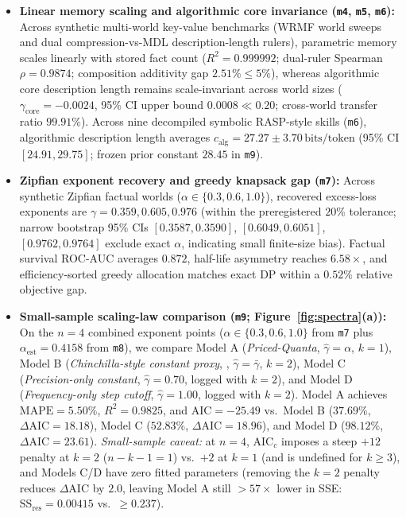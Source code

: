 \documentclass[10pt]{article} %
\begin{document}
\begin{itemize}[leftmargin=*]
    \item \textbf{Linear memory scaling and algorithmic core invariance (\texttt{m4}, \texttt{m5}, \texttt{m6}):} Across synthetic multi-world key-value benchmarks (WRMF world sweeps and dual compression-vs-MDL description-length rulers), parametric memory scales linearly with stored fact count ($R^2 = 0.999992$; dual-ruler Spearman $\rho = 0.9874$; composition additivity gap $2.51\% \le 5\%$), whereas algorithmic core description length remains scale-invariant across world sizes ($\gamma_{\text{core}} = -0.0024$, 95\% CI upper bound $0.0008 \ll 0.20$; cross-world transfer ratio $99.91\%$). Across nine decompiled symbolic RASP-style skills (\texttt{m6}), algorithmic description length averages $c_{\text{alg}} = 27.27 \pm 3.70\,\text{bits/token}$ (95\% CI $[24.91, 29.75]$; frozen prior constant $28.45$ in \texttt{m9}).
    \item \textbf{Zipfian exponent recovery and greedy knapsack gap (\texttt{m7}):} Across synthetic Zipfian factual worlds ($\alpha \in \{0.3, 0.6, 1.0\}$), recovered excess-loss exponents are $\gamma = 0.359, 0.605, 0.976$ (within the preregistered $20\%$ tolerance; narrow bootstrap 95\% CIs $[0.3587, 0.3590]$, $[0.6049, 0.6051]$, $[0.9762, 0.9764]$ exclude exact $\alpha$, indicating small finite-size bias). Factual survival ROC-AUC averages $0.872$, half-life asymmetry reaches $6.58\times$, and efficiency-sorted greedy allocation matches exact DP within a $0.52\%$ relative objective gap.
    \item \textbf{Small-sample scaling-law comparison (\texttt{m9}; Figure~\ref{fig:spectra}(a)):} On the $n=4$ combined exponent points ($\alpha \in \{0.3, 0.6, 1.0\}$ from \texttt{m7} plus $\alpha_{\text{est}} = 0.4158$ from \texttt{m8}), we compare Model A (\emph{Priced-Quanta}, $\hat{\gamma} = \alpha$, $k=1$), Model B (\emph{Chinchilla-style constant proxy}, \citealp{hoffmann2022chinchilla}, $\hat{\gamma} = \bar{\gamma}$, $k=2$), Model C (\emph{Precision-only constant}, $\hat{\gamma} = 0.70$, logged with $k=2$), and Model D (\emph{Frequency-only step cutoff}, $\hat{\gamma} = 1.00$, logged with $k=2$). Model A achieves $\text{MAPE} = 5.50\%$, $R^2 = 0.9825$, and $\text{AIC} = -25.49$ \citep{akaike1974aic} vs.\ Model B ($37.69\%$, $\Delta\text{AIC} = 18.18$), Model C ($52.83\%$, $\Delta\text{AIC} = 18.96$), and Model D ($98.12\%$, $\Delta\text{AIC} = 23.61$). \emph{Small-sample caveat:} at $n=4$, $\mathrm{AIC}_c$ \citep{burnham2002aic} imposes a steep $+12$ penalty at $k=2$ ($n-k-1=1$) vs.\ $+2$ at $k=1$ (and is undefined for $k \ge 3$), and Models C/D have zero fitted parameters (removing the $k=2$ penalty reduces $\Delta\text{AIC}$ by $2.0$, leaving Model A still $>57\times$ lower in SSE: $\text{SS}_{\text{res}} = 0.00415$ vs.\ $\ge 0.237$).

\end{itemize}
\end{document}
